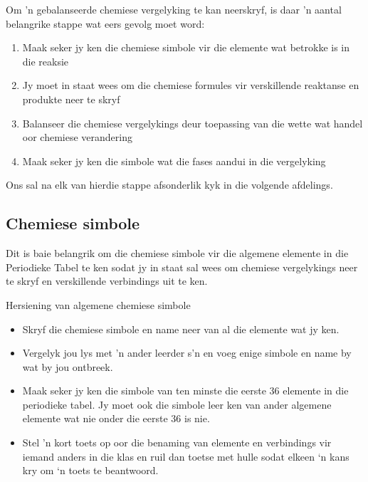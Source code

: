 Om 'n gebalanseerde chemiese vergelyking te kan neerskryf, is daar 'n aantal belangrike stappe
wat eers gevolg moet word: 
      \label{m38721*id62681}\begin{enumerate}[noitemsep, label=\textbf{\arabic*}. ] 
            \label{m38721*uid1}\item Maak seker jy ken die chemiese simbole vir die elemente wat betrokke is in die reaksie
\label{m38721*uid2}\item Jy moet in staat wees om die chemiese formules vir verskillende reaktanse en produkte neer te skryf
\label{m38721*uid3}\item Balanseer die chemiese vergelykings deur toepassing van die wette wat handel oor chemiese verandering 
\label{m38721*uid4}\item Maak seker jy ken die simbole wat die fases aandui in die vergelyking
\end{enumerate}
Ons sal na elk van hierdie stappe afsonderlik kyk in die volgende afdelings.
    \label{m38721*cid2}
            \subsection*{Chemiese simbole}
            \nopagebreak
Dit is baie belangrik om die chemiese simbole vir die algemene elemente in die Periodieke Tabel te ken
sodat jy in staat sal wees om chemiese vergelykings neer te skryf en verskillende verbindings uit te ken.\\
            \begin{activity}{Hersiening van algemene chemiese simbole}
            \nopagebreak
      \label{m38721*id62763}\begin{itemize}[noitemsep]
            \label{m38721*uid5}\item Skryf die chemiese simbole en name neer van al die elemente wat jy ken.
\label{m38721*uid6}\item Vergelyk jou lys met 'n ander leerder s’n en voeg enige simbole en name by wat by jou ontbreek.
\label{m38721*uid7}\item Maak seker jy ken die simbole van ten minste die eerste 36 elemente in die periodieke tabel. Jy moet ook die simbole leer ken van ander algemene elemente wat nie onder die eerste 36 is nie.
\label{m38721*uid8}\item Stel 'n kort toets op oor die benaming van elemente en verbindings vir iemand anders in die klas en ruil dan toetse met hulle sodat elkeen ‘n kans kry om ‘n toets te beantwoord.
\end{itemize}
\end{activity}
    \label{m38721*cid3}
